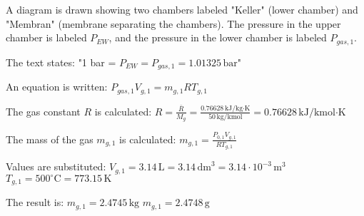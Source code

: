 A diagram is drawn showing two chambers labeled "Keller" (lower chamber) and "Membran" (membrane separating the chambers). The pressure in the upper chamber is labeled \( P_{EW} \), and the pressure in the lower chamber is labeled \( P_{gas,1} \).  

The text states:  
"1 bar = \( P_{EW} = P_{gas,1} = 1.01325 \, \text{bar} \)"  

An equation is written:  
\( P_{gas,1} V_{g,1} = m_{g,1} R T_{g,1} \)  

The gas constant \( R \) is calculated:  
\( R = \frac{\bar{R}}{M_g} = \frac{0.76628 \, \text{kJ}/\text{kg·K}}{50 \, \text{kg/kmol}} = 0.76628 \, \text{kJ}/\text{kmol·K} \)  

The mass of the gas \( m_{g,1} \) is calculated:  
\( m_{g,1} = \frac{P_{0,1} V_{g,1}}{R T_{g,1}} \)  

Values are substituted:  
\( V_{g,1} = 3.14 \, \text{L} = 3.14 \, \text{dm}^3 = 3.14 \cdot 10^{-3} \, \text{m}^3 \)  
\( T_{g,1} = 500^\circ \text{C} = 773.15 \, \text{K} \)  

The result is:  
\( m_{g,1} = 2.4745 \, \text{kg} \)  
\( m_{g,1} = 2.4748 \, \text{g} \)